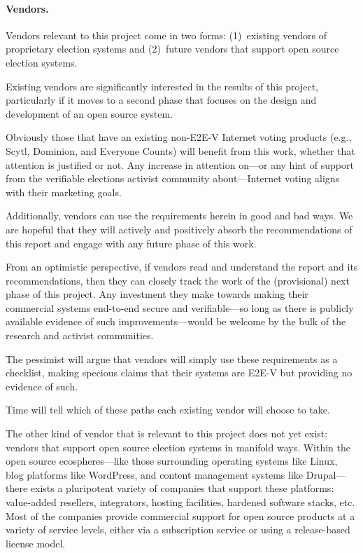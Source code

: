 \paragraph{Vendors.} Vendors relevant to this project come in two
forms: (1)~existing vendors of proprietary election systems and
(2)~future vendors that support open source election systems.

Existing vendors are significantly interested in the results of this
project, particularly if it moves to a second phase that focuses on
the design and development of an open source system.

Obviously those that have an existing non-E2E-V Internet voting
products (e.g., Scytl, Dominion, and Everyone Counts) will benefit from
this work, whether that attention is justified or not. Any increase in
attention on---or any hint of support from the verifiable elections
activist community about---Internet voting aligns with their marketing
goals.

Additionally, vendors can use the requirements herein in good and bad
ways. We are hopeful that they will actively and positively absorb the
recommendations of this report and engage with any future phase of
this work.

From an optimistic perspective, if vendors read and understand the
report and its recommendations, then they can closely track the work
of the (provisional) next phase of this project. Any investment they
make towards making their commercial systems end-to-end secure and
verifiable---so long as there is publicly available evidence of such
improvements---would be welcome by the bulk of the research and
activist communities.

The pessimist will argue that vendors will simply use these
requirements as a checklist, making specious claims that their systems
are E2E-V but providing no evidence of such.

Time will tell which of these paths each existing vendor will choose
to take.

The other kind of vendor that is relevant to this project does not yet
exist: vendors that support open source election systems in manifold
ways. Within the open source ecospheres---like those surrounding
operating systems like Linux, blog platforms like WordPress, and
content management systems like Drupal---there exists a pluripotent
variety of companies that support these platforms: value-added
resellers, integrators, hosting facilities, hardened software stacks,
etc. Most of the companies provide commercial support for
open source products at a variety of service levels, either via a
subscription service or using a release-based license model.

